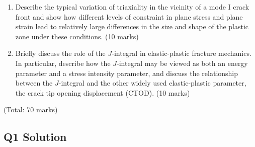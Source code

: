 \begin{enumerate}[label=(\alph*)]
\item Describe the typical variation of triaxiality in the vicinity of a mode I crack front and show how different levels of constraint in plane stress and plane strain lead to relatively large differences in the size and shape of the plastic zone under these conditions. \hfill(10 marks)

\item Briefly discuss the role of the $J$-integral in elastic-plastic fracture mechanics. In particular, describe how the $J$-integral may be viewed as both an energy parameter and a stress intensity parameter, and discuss the relationship between the $J$-integral and the other widely used elastic-plastic parameter, the crack tip opening displacement (CTOD). \hfill(10 marks)
\end{enumerate}
\hfill(Total: 70 marks)


\subsection{Q1 Solution}

